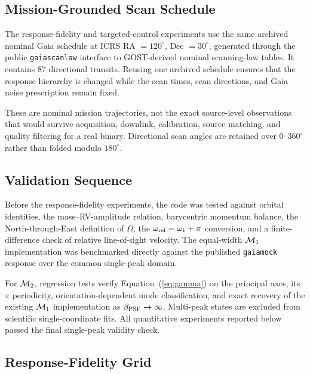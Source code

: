 \subsection{Mission-Grounded Scan Schedule}

The response-fidelity and targeted-control experiments use the same archived nominal Gaia schedule at ICRS RA $=120^\circ$, Dec $=30^\circ$, generated through the public \texttt{gaiascanlaw} interface to GOST-derived nominal scanning-law tables. It contains 87 directional transits. Reusing one archived schedule ensures that the response hierarchy is changed while the scan times, scan directions, and Gaia noise prescription remain fixed.

These are nominal mission trajectories, not the exact source-level observations that would survive acquisition, downlink, calibration, source matching, and quality filtering for a real binary. Directional scan angles are retained over $0$--$360^\circ$ rather than folded modulo $180^\circ$.

\subsection{Validation Sequence}

Before the response-fidelity experiments, the code was tested against orbital identities, the mass--RV-amplitude relation, barycentric momentum balance, the North-through-East definition of $\Omega$, the $\omega_{\rm rel}=\omega_1+\pi$ conversion, and a finite-difference check of relative line-of-sight velocity. The equal-width $\mathcal{M}_1$ implementation was benchmarked directly against the published \texttt{gaiamock} response over the common single-peak domain.

For $\mathcal{M}_2$, regression tests verify Equation~(\ref{eq:gamma}) on the principal axes, its $\pi$ periodicity, orientation-dependent mode classification, and exact recovery of the existing $\mathcal{M}_1$ implementation as $\beta_{\rm PSF}\rightarrow\infty$. Multi-peak states are excluded from scientific single-coordinate fits. All quantitative experiments reported below passed the final single-peak validity check.

\subsection{Response-Fidelity Grid}

